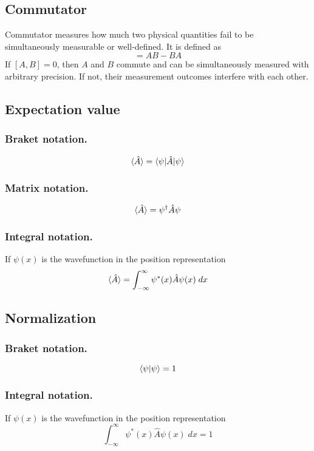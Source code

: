 \documentclass[../../../main.tex]{subfiles}
\begin{document}
\subsection{Commutator}
Commutator measures how much two physical quantities fail to be simultaneously measurable or well-defined. It is defined as 
\begin{equation*}
    [A,B]=AB-BA
\end{equation*}
If $[A,B]=0$, then $A$ and $B$ commute and can be simultaneously measured with arbitrary precision. If not, their measurement outcomes interfere with each other.

\subsection{Expectation value}
\subsubsection{Braket notation.}
\begin{equation*}
    \braket{\hat{A}}=\braket{\psi|\hat{A}|\psi}
\end{equation*}

\subsubsection{Matrix notation.}
\begin{equation*}
    \braket{\hat{A}}=\psi^{\dagger}\hat{A}\psi
\end{equation*}

\subsubsection{Integral notation.} If $\psi(x)$ is the wavefunction in the position representation
\begin{equation*}
    \braket{\hat{A}}=\int_{-\infty}^{\infty}\psi^*(x)\hat{A}\psi(x)\;dx
\end{equation*}

\subsection{Normalization}
\subsubsection{Braket notation.}
\begin{equation*}
    \braket{\psi|\psi}=1
\end{equation*}

\subsubsection{Integral notation.} If $\psi(x)$ is the wavefunction in the position representation
\begin{equation*}
    \int_{-\infty}^{\infty}\psi^*(x)\hat{A}\psi(x)\;dx=1
\end{equation*}
\end{document}
